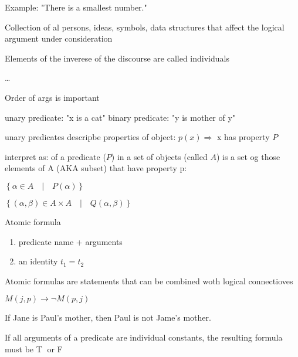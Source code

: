 \documentclass{article}
\begin{document}
Example: "There is a smallest number."

Collection of al persons, ideas, symbols, data structures that affect the logical argument under consideration

Elements of the inverese of the discourse are called individuals


\dots

Order of args is important

unary predicate: "x is a cat"
binary predicate: "y is mother of y"

unary predicates descripbe properties of object:
$ p \left( x \right) \Rightarrow $ x has property $ P $

interpret as: of a predicate ($P$) in a set of objects (called $A$) is a set og those elements of A (AKA subset) that have property p:

$ \left\{ \alpha \in A \quad | \quad P \left( \alpha \right)\right\} $

$ \left\{ (\alpha, \beta) \in A \times A \quad | \quad Q \left( \alpha, \beta \right)\right\} $


Atomic formula
\begin{enumerate}
  \item predicate name + arguments
  \item an identity $t_1 = t_2$
\end{enumerate}

Atomic formulas are statements that can be combined woth logical connectioves

$M \left( j, p \right) \rightarrow \neg M \left( p, j \right)$

If Jane is Paul's mother, then Paul is not Jame's mother.

If all arguments of a predicate are individual constants, the resulting formula must be \textcircled{T} or \textcircled{F}
\end{document}
